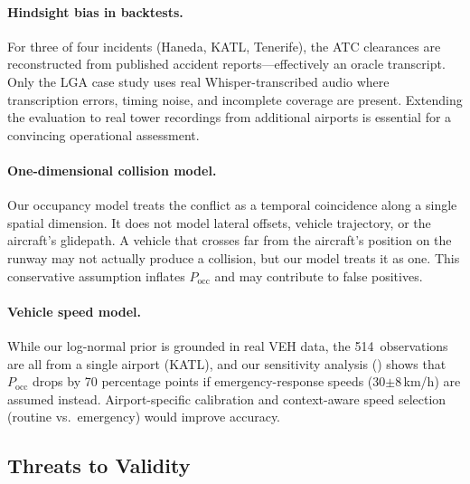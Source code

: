 \documentclass[11pt,a4paper]{article}
\begin{document}
\paragraph{Hindsight bias in backtests.}
For three of four incidents (Haneda, KATL, Tenerife), the ATC clearances are reconstructed from published accident reports---effectively an oracle transcript.
Only the LGA case study uses real Whisper-transcribed audio where transcription errors, timing noise, and incomplete coverage are present.
Extending the evaluation to real tower recordings from additional airports is essential for a convincing operational assessment.

\paragraph{One-dimensional collision model.}
Our occupancy model treats the conflict as a temporal coincidence along a single spatial dimension.
It does not model lateral offsets, vehicle trajectory, or the aircraft's glidepath.
A vehicle that crosses far from the aircraft's position on the runway may not actually produce a collision, but our model treats it as one.
This conservative assumption inflates $P_{\mathrm{occ}}$ and may contribute to false positives.

\paragraph{Vehicle speed model.}
While our log-normal prior is grounded in real VEH data, the 514~observations are all from a single airport (KATL), and our sensitivity analysis () shows that $P_{\mathrm{occ}}$ drops by 70 percentage points if emergency-response speeds (30$\pm$8\,km/h) are assumed instead.
Airport-specific calibration and context-aware speed selection (routine vs.\ emergency) would improve accuracy.

\subsection{Threats to Validity}
\label{sec:threats}
\end{document}
